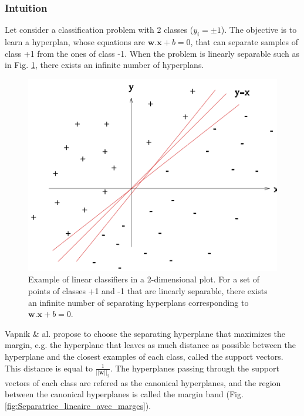 \subsubsection{Intuition}
Let consider a classification problem with 2 classes ($y_i= \pm 1$). The objective is to learn a hyperplan, whose equations are $\textbf{w}. \textbf{x} + b = 0$, that can separate samples of class +1 from the ones of class -1. When the problem is linearly separable such as in Fig. \ref{fig:Plusieurs_separatrice_lineaire}, there exists an infinite number of hyperplans. 

\begin{figure}[h!]
\centering
\includegraphics[width=0.4\linewidth]{images/Plusieurs_separatrice_lineaire}
\caption{Example of linear classifiers in a 2-dimensional plot. For a set of points of classes +1 and -1 that are linearly separable, there exists an infinite number of separating hyperplans corresponding to $\textbf{w}.\textbf{x} + b = 0.$}
\label{fig:Plusieurs_separatrice_lineaire}
\end{figure}

\noindent Vapnik \& al. \cite{Cortes1995} propose to choose the separating hyperplane that maximizes the margin, e.g. the hyperplane that leaves as much distance as possible between the hyperplane and the closest examples of each class, called the support vectors. This distance is equal to $\frac{1}{||\textbf{w}||_2}$. The hyperplanes passing through the support vectors of each class are refered as the canonical hyperplanes, and the region between the canonical hyperplanes is called the margin band (Fig. \ref{fig:Separatrice_lineaire_avec_marges}).

